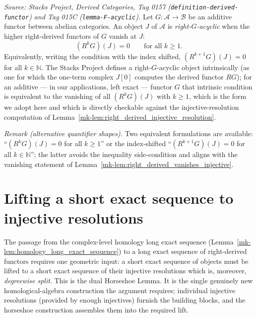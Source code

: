 \begin{definition}\label{mk-def:right_acyclic}
  \leanok

  \textit{Source: Stacks Project, Derived Categories, Tag 0157
  (\texttt{definition-derived-functor}) and Tag 015C
  (\texttt{lemma-F-acyclic}).}
  Let \(G : \mathcal{A} \to \mathcal{B}\) be an additive functor between abelian
  categories. An object \(J\) of \(\mathcal{A}\) is \emph{right-\(G\)-acyclic} when
  the higher right-derived functors of \(G\) vanish at \(J\):
  \[
    (R^k G)(J) = 0 \qquad \text{for all } k \geq 1.
  \]
  Equivalently, writing the condition with the index shifted, \((R^{k+1} G)(J) = 0\)
  for all \(k \in \mathbb{N}\). The Stacks Project defines a right-\(G\)-acyclic
  object intrinsically (as one for which the one-term complex \(J[0]\) computes the
  derived functor \(RG\)); for an additive --- in our applications, left exact ---
  functor \(G\) that intrinsic condition is equivalent to the vanishing of all
  \((R^k G)(J)\) with \(k \geq 1\), which is the form we adopt here and which is
  directly checkable against the injective-resolution computation of
  Lemma~\ref{mk-lem:right_derived_injective_resolution}.

  \emph{Remark (alternative quantifier shapes).} Two equivalent formulations are
  available: ``\((R^k G)(J) = 0\) for all \(k \geq 1\)'' or the index-shifted
  ``\((R^{k+1} G)(J) = 0\) for all \(k \in \mathbb{N}\)''; the latter avoids the
  inequality side-condition and aligns with the vanishing statement of
  Lemma~\ref{mk-lem:right_derived_vanishes_injective}.
\end{definition}

\section{Lifting a short exact sequence to injective resolutions}

The passage from the complex-level homology long exact sequence
(Lemma~\ref{mk-lem:homology_long_exact_sequence}) to a long exact sequence of
right-derived functors requires one geometric input: a short exact sequence of
objects must be lifted to a short exact sequence of their injective resolutions
which is, moreover, \emph{degreewise split}. This is the dual Horseshoe Lemma. It is the single genuinely new homological-algebra construction the argument
requires; individual injective resolutions (provided by enough injectives) furnish
the building blocks, and the horseshoe construction assembles them into the required
lift.

